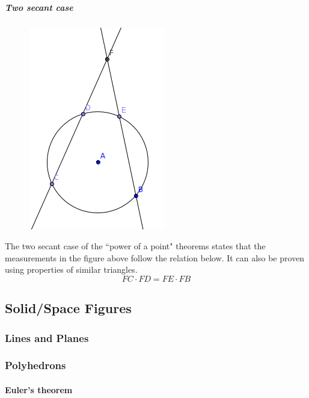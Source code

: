 \subparagraph{Two secant case}
\begin{figure}[h!]
    \centering
    \includegraphics[scale=0.5]{assets/images/twosecant.png}
\end{figure}
The two secant case of the ``power of a point" theorems states that the measurements in the figure above follow the relation below.
It can also be proven using properties of similar triangles.
$$FC \cdot FD = FE \cdot FB$$

\subsection{Solid/Space Figures}

\subsubsection{Lines and Planes}

\subsubsection{Polyhedrons}
\paragraph{Euler's theorem}
